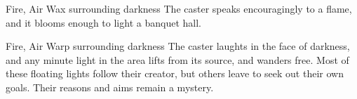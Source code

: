   {Fire, Air}%
  {Wax}%
  {}%
  {surrounding darkness}%
  {The caster speaks encouragingly to a flame, and it blooms enough to light a banquet hall.}%
  {}

  {Fire, Air}%
  {Warp}%
  {}%
  {surrounding darkness}%
  {The caster laughts in the face of darkness, and any minute light in the area lifts from its source, and wanders free.}%
  {Most of these floating lights follow their creator, but others leave to seek out their own goals.
  Their reasons and aims remain a mystery.}

